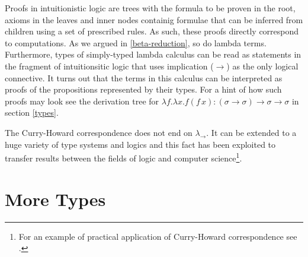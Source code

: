 \documentclass[11pt,twoside,a4paper]{article} %
\begin{document}
Proofs in intuitionistic logic are trees with the formula to be proven in the root,
axioms in the leaves and inner nodes containig formulae that can be inferred
from children using a set of prescribed rules. As such, these proofs directly
correspond to computations. As we argued in \ref{beta-reduction}, so do lambda
terms. Furthermore, types of simply-typed lambda calculus can be read as statements 
in the fragment of intuitionsitic logic that uses implication ($\rightarrow$) as 
the only logical connective. It turns out that the terms in this calculus can
be interpreted as proofs of the propositions represented by their types. For a
hint of how such proofs may look see the derivation tree for
$\lambda f.\lambda x.f(f\,x):(\sigma\rightarrow\sigma)\rightarrow\sigma\rightarrow\sigma$
in section \ref{types}.

The Curry-Howard correspondence does not end on $\lambda_\rightarrow$. It can
be extended to a huge variety of type systems and logics and this fact has been 
exploited to transfer results between the fields of logic and computer 
science\footnote{For an example of practical application of Curry-Howard correspondence 
see \cite{s11}.}.

\section{More Types}
\end{document}
